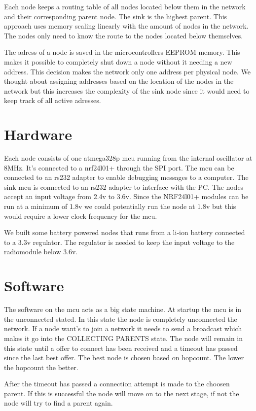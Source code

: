 \documentclass[a4paper,11pt]{article}
\begin{document}
Each node keeps a routing table of all nodes located below them in the
network and their corresponding parent node. The sink is the highest
parent. This approach uses memory scaling linearly with the amount of
nodes in the network. The nodes only need to know the route to the
nodes located below themselves.

The adress of a node is saved in the microcontrollers EEPROM memory.
This makes it possible to completely shut down a node without it
needing a new address. This decision makes the network only one
address per physical node. We thought about assigning addresses based
on the location of the nodes in the network but this increases the
complexity of the sink node since it would need to keep track of all
active adresses.

\section{Hardware}
Each node consists of one atmega328p mcu running from the internal
oscillator at 8MHz. It's connected to a nrf24l01+ through the SPI
port. The mcu can be connected to an rs232 adapter to enable debugging
messages to a computer. The sink mcu is connected to an rs232 adapter
to interface with the PC. The nodes accept an input voltage from 2.4v
to 3.6v. Since the NRF24l01+ modules can be run at a minimum of 1.8v
we could potentially run the node at 1.8v but this would require a
lower clock frequency for the mcu\cite{Atmega}.

We built some battery powered nodes that runs from a li-ion battery
connected to a 3.3v regulator. The regulator is needed to keep the
input voltage to the radiomodule below 3.6v.

\section{Software}
The software on the mcu acts as a big state machine. At startup the
mcu is in the unconnected stated. In this state the node is completely
unconnected the network. If a node want's to join a network it needs
to send a broadcast which makes it go into the COLLECTING PARENTS
state. The node will remain in this state until a offer to connect has
been received and a timeout has passed since the last best offer. The
best node is chosen based on hopcount. The lower the hopcount the
better.

After the timeout has passed a connection attempt is made to the
choosen parent. If this is successful the node will move on to the
next stage, if not the node will try to find a parent again.
\end{document}
